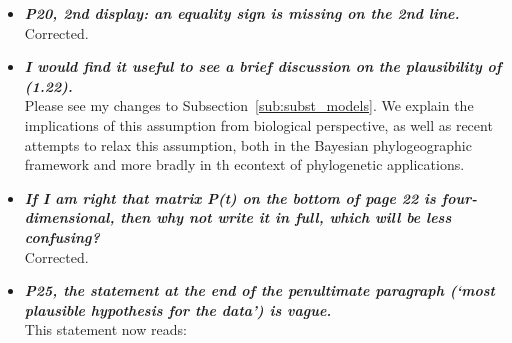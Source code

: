 \documentclass[english]{article}
\begin{document}
\begin{itemize}
\item {
{\it
\textbf{
P20, 2nd display: an equality sign is missing on the 2nd line.
}%
}%
}%
\\
Corrected.

\item {
{\it
\textbf{
I would find it useful to see a brief discussion on the plausibility of (1.22).
}%
}%
}%
\\
Please see my changes to Subsection~\ref{sub:subst_models}.
We explain the implications of this assumption from biological perspective, as well as recent attempts to relax this assumption, both in the Bayesian phylogeographic framework and more bradly in th econtext of phylogenetic applications.


\item {
{\it
\textbf{
If I am right that matrix P(t) on the bottom of page 22 is four-dimensional, then why not write it in full, which will be less confusing?
}%
}%
}%
\\
Corrected.




\item {
{\it
\textbf{
P25, the statement at the end of the penultimate paragraph (`most plausible hypothesis for the data') is vague.
}%
}%
}%
\\
This statement now reads:

\begin{quote}
\myeditsveight
\end{quote}










\end{itemize}
\end{document}
